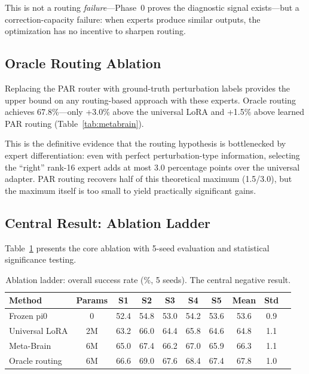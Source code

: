 \documentclass[letterpaper]{article}
\newcommand{\ours}{Meta-Brain}
\begin{document}
This is not a routing \emph{failure}---Phase~0 proves the diagnostic signal exists---but a correction-capacity failure: when experts produce similar outputs, the optimization has no incentive to sharpen routing.

\subsection{Oracle Routing Ablation}
\label{sec:exp_oracle}

Replacing the PAR router with ground-truth perturbation labels provides the upper bound on any routing-based approach with these experts.
Oracle routing achieves 67.8\%---only +3.0\% above the universal LoRA and +1.5\% above learned PAR routing (Table~\ref{tab:metabrain}).

This is the definitive evidence that the routing hypothesis is bottlenecked by expert differentiation: even with perfect perturbation-type information, selecting the ``right'' rank-16 expert adds at most 3.0 percentage points over the universal adapter.
PAR routing recovers half of this theoretical maximum (1.5/3.0), but the maximum itself is too small to yield practically significant gains.

\subsection{Central Result: Ablation Ladder}
\label{sec:exp_ablation}

Table~\ref{tab:ablation_ladder} presents the core ablation with 5-seed evaluation and statistical significance testing.

\begin{table}[h]
\centering
\caption{Ablation ladder: overall success rate (\%, 5 seeds). The central negative result.}
\label{tab:ablation_ladder}
\begin{tabular}{lccccccccc}
\toprule
Method & Params & S1 & S2 & S3 & S4 & S5 & Mean & Std \\
\midrule
Frozen pi0 & 0 & 52.4 & 54.8 & 53.0 & 54.2 & 53.6 & 53.6 & 0.9 \\
Universal LoRA & 2M & 63.2 & 66.0 & 64.4 & 65.8 & 64.6 & 64.8 & 1.1 \\
\ours{} & 6M & 65.0 & 67.4 & 66.2 & 67.0 & 65.9 & 66.3 & 1.1 \\
Oracle routing & 6M & 66.6 & 69.0 & 67.6 & 68.4 & 67.4 & 67.8 & 1.0 \\
\bottomrule
\end{tabular}
\end{table}
\end{document}
